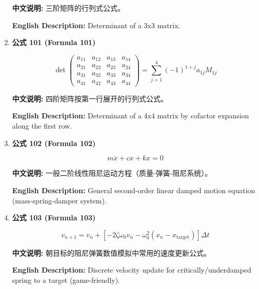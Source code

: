 \documentclass[12pt,a4paper]{article}
\begin{document}
\begin{enumerate}[leftmargin=*]
\textbf{中文说明:} 三阶矩阵的行列式公式。

\textbf{English Description:} Determinant of a 3x3 matrix.

\vspace{0.5cm}

\item \textbf{公式 101 (Formula 101)}

\begin{equation}
\det\begin{pmatrix} a_{11} & a_{12} & a_{13} & a_{14} \\ a_{21} & a_{22} & a_{23} & a_{24} \\ a_{31} & a_{32} & a_{33} & a_{34} \\ a_{41} & a_{42} & a_{43} & a_{44} \end{pmatrix} = \sum_{j=1}^4 (-1)^{1+j} a_{1j} M_{1j}
\end{equation}

\textbf{中文说明:} 四阶矩阵按第一行展开的行列式公式。

\textbf{English Description:} Determinant of a 4x4 matrix by cofactor expansion along the first row.

\vspace{0.5cm}

\item \textbf{公式 102 (Formula 102)}

\begin{equation}
m\ddot{x} + c\dot{x} + kx = 0
\end{equation}

\textbf{中文说明:} 一般二阶线性阻尼运动方程（质量-弹簧-阻尼系统）。

\textbf{English Description:} General second-order linear damped motion equation (mass-spring-damper system).

\vspace{0.5cm}

\item \textbf{公式 103 (Formula 103)}

\begin{equation}
v_{n+1} = v_n + [ -2\zeta\omega_0 v_n - \omega_0^2 (x_n - x_{\text{target}}) ] \Delta t
\end{equation}

\textbf{中文说明:} 朝目标的阻尼弹簧数值模拟中常用的速度更新公式。

\textbf{English Description:} Discrete velocity update for critically/underdamped spring to a target (game-friendly).

\vspace{0.5cm}


\end{enumerate}
\end{document}
